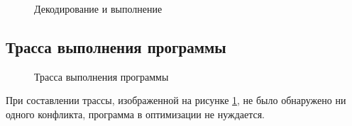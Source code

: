 \begin{figure}[ph!]
    \caption{Декодирование и выполнение}
\end{figure}

\clearpage
\subsection{Трасса выполнения программы}


\begin{figure}[h]
    \centering
    
    \caption{Трасса выполнения программы}
    \label{fig:trace}
\end{figure}

При составлении трассы, изображенной на рисунке \ref{fig:trace},
не было обнару\-жено ни одного конфликта, программа в оптимизации не
нуждается.
